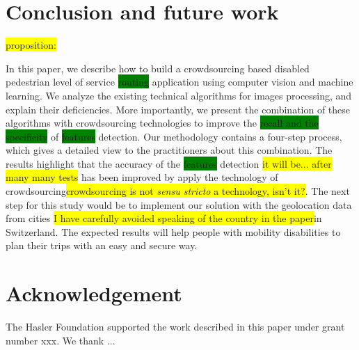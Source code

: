 \documentclass[10pt,conference,a4paper]{IEEEtran}
\begin{document}
\section{Conclusion and future work}


\colorbox{yellow}{proposition:}

In this paper, we describe how to build a crowdsourcing based disabled pedestrian level of service \colorbox{green}{routing} application using computer vision and machine learning. We analyze the existing technical algorithms for images processing, and explain their deficiencies. More importantly, we present the combination of these algorithms with crowdsourcing technologies to improve the \colorbox{green}{recall and the specificity} of \colorbox{green}{features} detection. Our methodology contains a four-step process, which gives a detailed view to the practitioners about this combination. The results highlight that the accuracy of the \colorbox{green}{features} detection \colorbox{yellow}{it will be... after many many tests} has been improved by apply the technology of crowdsourcing\colorbox{yellow}{crowdsourcing is not \emph{sensu stricto} a technology, isn't it?}. The next step for this study would be to implement our solution with the geolocation data from cities \colorbox{yellow}{I have carefully avoided speaking of the country in the paper}in Switzerland. The expected results will help people with mobility disabilities to plan their trips with an easy and secure way.

\section{Acknowledgement}
The Hasler Foundation supported the work described in this paper under grant number xxx. We thank ...





\end{document}
